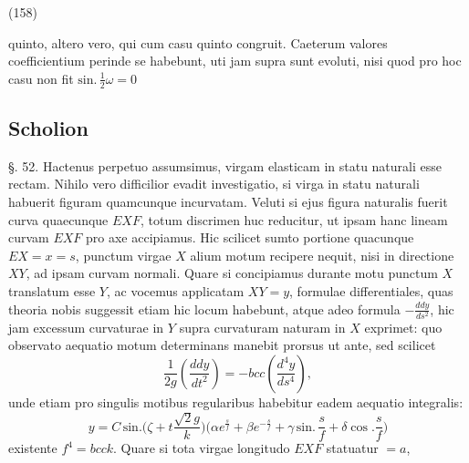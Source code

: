 \documentclass[11pt,a4paper]{article}
\begin{document}
(158)

quinto, altero vero, qui cum casu quinto congruit. Caeterum valores
coefficientium perinde se habebunt, uti jam supra sunt evoluti,
nisi quod pro hoc casu non fit $\text{sin.}\,\frac{1}{2}\omega=0$

\subsection{Scholion}

§. 52. Hactenus perpetuo assumsimus, virgam elasticam in
statu naturali esse rectam. Nihilo vero difficilior evadit investigatio,
si virga in statu naturali habuerit figuram quamcunque incurvatam.
Veluti si ejus figura naturalis fuerit curva quaecunque $EXF$,
totum discrimen huc reducitur, ut ipsam hanc lineam curvam $EXF$
pro axe accipiamus. Hic scilicet sumto portione quacunque
$EX=x=s$, punctum virgae $X$ alium motum recipere nequit,
nisi in directione $XY$, ad ipsam curvam normali. Quare si
concipiamus durante motu punctum $X$ translatum esse $Y$, ac vocemus
 applicatam $XY=y$, formulae differentiales, quas theoria
nobis suggessit etiam hic locum habebunt, atque adeo formula
$-\frac{ddy}{ds^2}$, hic jam excessum curvaturae in $Y$ supra curvaturam naturam
in $X$ exprimet: quo observato aequatio motum determinans manebit
prorsus ut ante, sed scilicet
\[ \frac{1}{2g}\left(\frac{ddy}{dt^2}\right)=-bcc\left(\frac{d^4y}{ds^4}\right), \]
unde etiam pro singulis motibus regularibus habebitur eadem
aequatio integralis:
\[ y=C\,\text{sin.}\Big(\zeta+t\frac{\surd 2g}{k}\Big)\Big(\alpha e^{\frac{s}{f}}+\beta e^{-\frac{s}{f}}+\gamma\,\text{sin.}\,\frac{s}{f}+\delta\cos.\frac{s}{f}\Big) \]
existente $f^4=bcck$. Quare si tota virgae longitudo $EXF$ statuatur $=a$,
\end{document}
